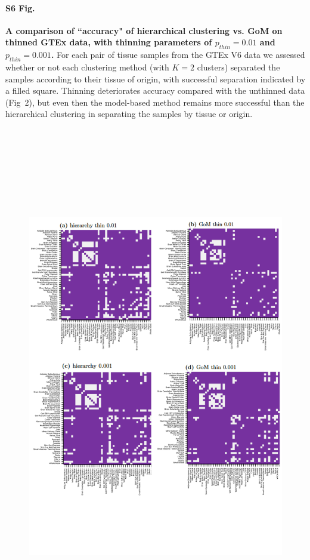 \documentclass[10pt,letterpaper]{article}
\begin{document}
\paragraph*{S6 Fig.}
\label{figS6}
{\bf A comparison of ``accuracy" of hierarchical clustering vs. GoM on thinned GTEx data, with thinning parameters of $p_{thin}=0.01$ and $p_{thin}=0.001$.}  For each pair of tissue samples from the GTEx V6 data we assessed whether or not each clustering method (with $K=2$ clusters) separated the samples according to their tissue of origin, with successful separation indicated by a filled square. Thinning deteriorates accuracy compared with the unthinned data (Fig~2), but even then the model-based method remains more successful than the hierarchical clustering in separating the samples by tissue or origin.
\begin{figure}[ht]
\centering
\includegraphics[height=9in, width=7in]{../figs-edits/figS6-edits.pdf}
\end{figure}
\end{document}
